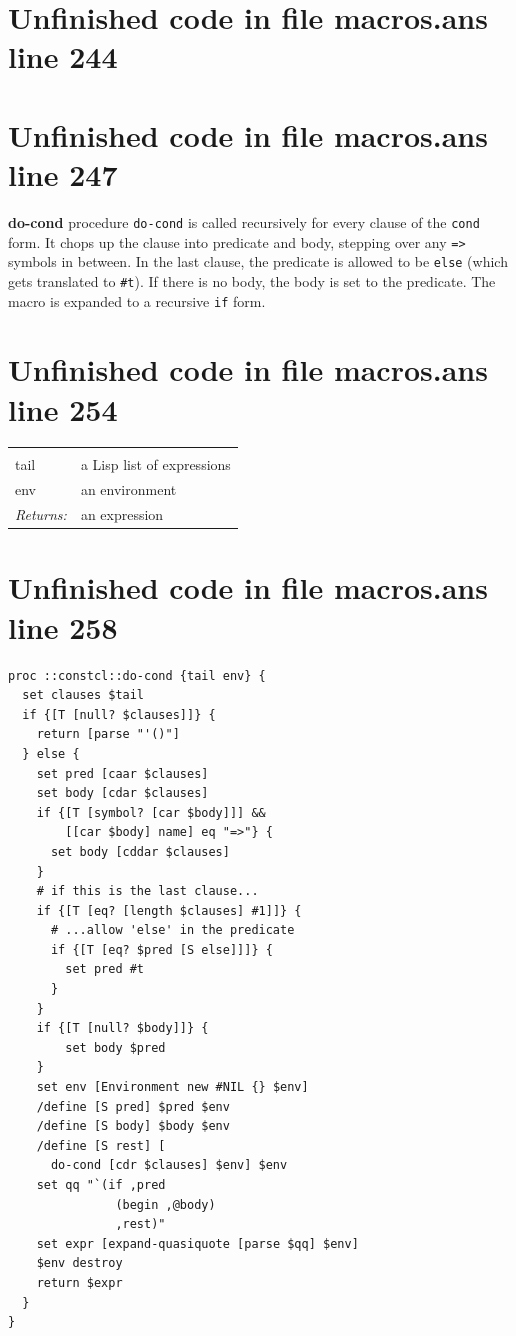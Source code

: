 \documentclass[twoside,9pt]{report}
\begin{document}
\section{Unfinished code in file macros.ans line 244}

\section{Unfinished code in file macros.ans line 247}

\textbf{do-cond} procedure \texttt{do-cond} is called recursively for every clause of the \texttt{cond} form. It chops up the clause into predicate and body, stepping over any \texttt{=>} symbols in between. In the last clause, the predicate is allowed to be \texttt{else} (which gets translated to \texttt{\#t}). If there is no body, the body is set to the predicate. The macro is expanded to a recursive \texttt{if} form.

\section{Unfinished code in file macros.ans line 254}
\noindent\begin{tabular}{ |p{1.9cm} p{8cm}| }
\hline
\rowcolor[HTML]{CCCCCC} \multicolumn{2}{|l|}{\bf do-cond (internal)} \\
tail & a Lisp list of expressions \\
env & an environment \\
\textit{Returns:} & an expression \\
\hline
\end{tabular}
\section{Unfinished code in file macros.ans line 258}
\begin{lstlisting}
proc ::constcl::do-cond {tail env} {
  set clauses $tail
  if {[T [null? $clauses]]} {
    return [parse "'()"]
  } else {
    set pred [caar $clauses]
    set body [cdar $clauses]
    if {[T [symbol? [car $body]]] &&
        [[car $body] name] eq "=>"} {
      set body [cddar $clauses]
    }
    # if this is the last clause...
    if {[T [eq? [length $clauses] #1]]} {
      # ...allow 'else' in the predicate
      if {[T [eq? $pred [S else]]]} {
        set pred #t
      }
    }
    if {[T [null? $body]]} {
        set body $pred
    }
    set env [Environment new #NIL {} $env]
    /define [S pred] $pred $env
    /define [S body] $body $env
    /define [S rest] [
      do-cond [cdr $clauses] $env] $env
    set qq "`(if ,pred
               (begin ,@body)
               ,rest)"
    set expr [expand-quasiquote [parse $qq] $env]
    $env destroy
    return $expr
  }
}
\end{lstlisting}
\end{document}
